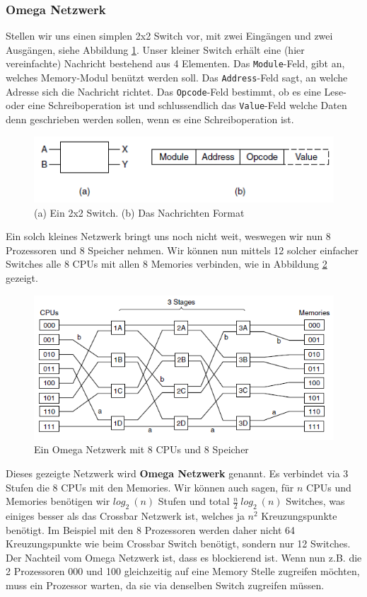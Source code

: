 \subsubsection{Omega Netzwerk}
Stellen wir uns einen simplen 2x2 Switch vor, mit zwei Eingängen und zwei Ausgängen, siehe Abbildung \ref{fig:omegaswitch}. Unser kleiner Switch erhält eine (hier vereinfachte) Nachricht bestehend aus 4 Elementen. Das \texttt{Module}-Feld, gibt an, welches Memory-Modul benützt werden soll. Das \texttt{Address}-Feld sagt, an welche Adresse sich die Nachricht richtet. Das \texttt{Opcode}-Feld bestimmt, ob es eine Lese- oder eine Schreiboperation ist und schlussendlich das \texttt{Value}-Feld welche Daten denn geschrieben werden sollen, wenn es eine Schreiboperation ist.
\begin{figure}[h]
	\centering
	\includegraphics[width=0.7\linewidth]{fig/omega_switch}
	\caption{(a) Ein 2x2 Switch. (b) Das Nachrichten Format}
	\label{fig:omegaswitch}
	\end{figure}

Ein solch kleines Netzwerk bringt uns noch nicht weit, weswegen wir nun 8 Prozessoren und 8 Speicher nehmen. Wir können nun mittels 12 solcher einfacher Switches alle 8 CPUs mit allen 8 Memories verbinden, wie in Abbildung \ref{fig:omega_gross} gezeigt.
\begin{figure}[h]
	\centering
	\includegraphics[width=0.7\linewidth]{fig/omega_gross}
	\caption{Ein Omega Netzwerk mit 8 CPUs und 8 Speicher}
	\label{fig:omega_gross}
	\end{figure}
Dieses gezeigte Netzwerk wird \textbf{Omega Netzwerk} genannt. Es verbindet via 3 Stufen die 8 CPUs mit den Memories. Wir können auch sagen, für $ n $ CPUs und Memories benötigen wir $ log_{2}\ (n) $ Stufen und total $ \frac{n}{2}\ log_{2}\ (n) $ Switches, was einiges besser als das Crossbar Netzwerk ist, welches ja $ n^{2} $ Kreuzungspunkte benötigt. Im Beispiel mit den 8 Prozessoren werden daher nicht 64 Kreuzungspunkte wie beim Crossbar Switch benötigt, sondern nur 12 Switches. Der Nachteil vom Omega Netzwerk ist, dass es blockierend ist. Wenn nun z.B. die 2 Prozessoren 000 und 100 gleichzeitig auf eine Memory Stelle zugreifen möchten, muss ein Prozessor warten, da sie via denselben Switch zugreifen müssen.

